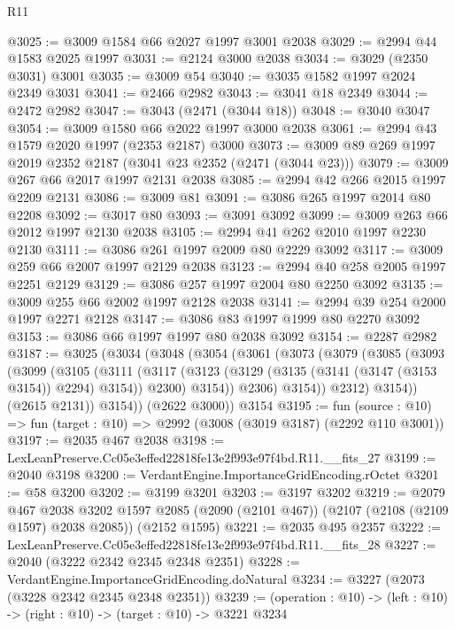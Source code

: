 \begin{lexlean}{R11}
\begin{coremodule}
@3025 := @3009 @1584 @66 @2027 @1997 @3001 @2038
@3029 := @2994 @44 @1583 @2025 @1997
@3031 := @2124 @3000 @2038
@3034 := @3029 (@2350 @3031) @3001
@3035 := @3009 @54
@3040 := @3035 @1582 @1997 @2024 @2349 @3031
@3041 := @2466 @2982
@3043 := @3041 @18 @2349
@3044 := @2472 @2982
@3047 := @3043 (@2471 (@3044 @18))
@3048 := @3040 @3047
@3054 := @3009 @1580 @66 @2022 @1997 @3000 @2038
@3061 := @2994 @43 @1579 @2020 @1997 (@2353 @2187) @3000
@3073 := @3009 @89 @269 @1997 @2019 @2352 @2187 (@3041 @23 @2352 (@2471 (@3044 @23)))
@3079 := @3009 @267 @66 @2017 @1997 @2131 @2038
@3085 := @2994 @42 @266 @2015 @1997 @2209 @2131
@3086 := @3009 @81
@3091 := @3086 @265 @1997 @2014 @80 @2208
@3092 := @3017 @80
@3093 := @3091 @3092
@3099 := @3009 @263 @66 @2012 @1997 @2130 @2038
@3105 := @2994 @41 @262 @2010 @1997 @2230 @2130
@3111 := @3086 @261 @1997 @2009 @80 @2229 @3092
@3117 := @3009 @259 @66 @2007 @1997 @2129 @2038
@3123 := @2994 @40 @258 @2005 @1997 @2251 @2129
@3129 := @3086 @257 @1997 @2004 @80 @2250 @3092
@3135 := @3009 @255 @66 @2002 @1997 @2128 @2038
@3141 := @2994 @39 @254 @2000 @1997 @2271 @2128
@3147 := @3086 @83 @1997 @1999 @80 @2270 @3092
@3153 := @3086 @66 @1997 @1997 @80 @2038 @3092
@3154 := @2287 @2982
@3187 := @3025
    (@3034
      (@3048
        (@3054
          (@3061
            (@3073
              (@3079
                (@3085
                  (@3093
                    (@3099
                      (@3105
                        (@3111
                          (@3117
                            (@3123 (@3129 (@3135 (@3141 (@3147 (@3153 @3154)) @2294) @3154)) @2300)
                            @3154))
                        @2306)
                      @3154))
                  @2312)
                @3154))
            (@2615 @2131))
          @3154))
      (@2622 @3000))
    @3154
@3195 := fun (source : @10) => fun (target : @10) => @2992 (@3008 (@3019 @3187) (@2292 @110 @3001))
@3197 := @2035 @467 @2038
@3198 := LexLeanPreserve.Cc05e3effed22818fe13e2f993e97f4bd.R11.__fits_27
@3199 := @2040 @3198
@3200 := VerdantEngine.ImportanceGridEncoding.rOctet
@3201 := @58 @3200
@3202 := @3199 @3201
@3203 := @3197 @3202
@3219 := @2079
    @467
    @2038
    @3202
    @1597
    @2085
    (@2090 (@2101 @467))
    (@2107 (@2108 (@2109 @1597) @2038 @2085))
    (@2152 @1595)
@3221 := @2035 @495 @2357
@3222 := LexLeanPreserve.Cc05e3effed22818fe13e2f993e97f4bd.R11.__fits_28
@3227 := @2040 (@3222 @2342 @2345 @2348 @2351)
@3228 := VerdantEngine.ImportanceGridEncoding.doNatural
@3234 := @3227 (@2073 (@3228 @2342 @2345 @2348 @2351))
@3239 := (operation : @10) -> (left : @10) -> (right : @10) -> (target : @10) -> @3221 @3234

\end{coremodule}
\end{lexlean}
